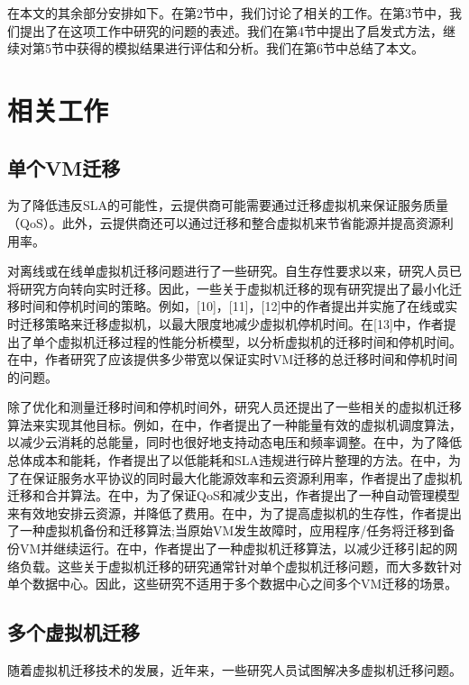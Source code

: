 在本文的其余部分安排如下。在第2节中，我们讨论了相关的工作。在第3节中，我们提出了在这项工作中研究的问题的表述。我们在第4节中提出了启发式方法，继续对第5节中获得的模拟结果进行评估和分析。我们在第6节中总结了本文。

\chapter{相关工作}

\section{单个VM迁移}
为了降低违反SLA的可能性，云提供商可能需要通过迁移虚拟机来保证服务质量（QoS）。此外，云提供商还可以通过迁移和整合虚拟机来节省能源并提高资源利用率。

对离线或在线单虚拟机迁移问题进行了一些研究\cite{khazaei2013performance,zhang2014delay,ding2015energy,rao2015heuristics,chen2014consolidating,mohamed2015autonomic,xu2013enhancing,huang2013multi}。自生存性要求以来，研究人员已将研究方向转向实时迁移。因此，一些关于虚拟机迁移的现有研究提出了最小化迁移时间和停机时间的策略。例如，[10]，[11]，[12]中的作者提出并实施了在线或实时迁移策略来迁移虚拟机，以最大限度地减少虚拟机停机时间。在[13]中，作者提出了单个虚拟机迁移过程的性能分析模型，以分析虚拟机的迁移时间和停机时间。在\cite{zhang2014delay}中，作者研究了应该提供多少带宽以保证实时VM迁移的总迁移时间和停机时间的问题。

除了优化和测量迁移时间和停机时间外，研究人员还提出了一些相关的虚拟机迁移算法来实现其他目标。例如，在\cite{ding2015energy}中，作者提出了一种能量有效的虚拟机调度算法，以减少云消耗的总能量，同时也很好地支持动态电压和频率调整。在\cite{rao2015heuristics}中，为了降低总体成本和能耗，作者提出了以低能耗和SLA违规进行碎片整理的方法。在\cite{chen2014consolidating}中，为了在保证服务水平协议的同时最大化能源效率和云资源利用率，作者提出了虚拟机迁移和合并算法。在\cite{mohamed2015autonomic}中，为了保证QoS和减少支出，作者提出了一种自动管理模型来有效地安排云资源，并降低了费用。在\cite{xu2013enhancing}中，为了提高虚拟机的生存性，作者提出了一种虚拟机备份和迁移算法;当原始VM发生故障时，应用程序/任务将迁移到备份VM并继续运行。在\cite{huang2013multi}中，作者提出了一种虚拟机迁移算法，以减少迁移引起的网络负载。这些关于虚拟机迁移的研究通常针对单个虚拟机迁移问题，而大多数针对单个数据中心。因此，这些研究不适用于多个数据中心之间多个VM迁移的场景。

\section{多个虚拟机迁移}
随着虚拟机迁移技术的发展，近年来，一些研究人员试图解决多虚拟机迁移问题。

